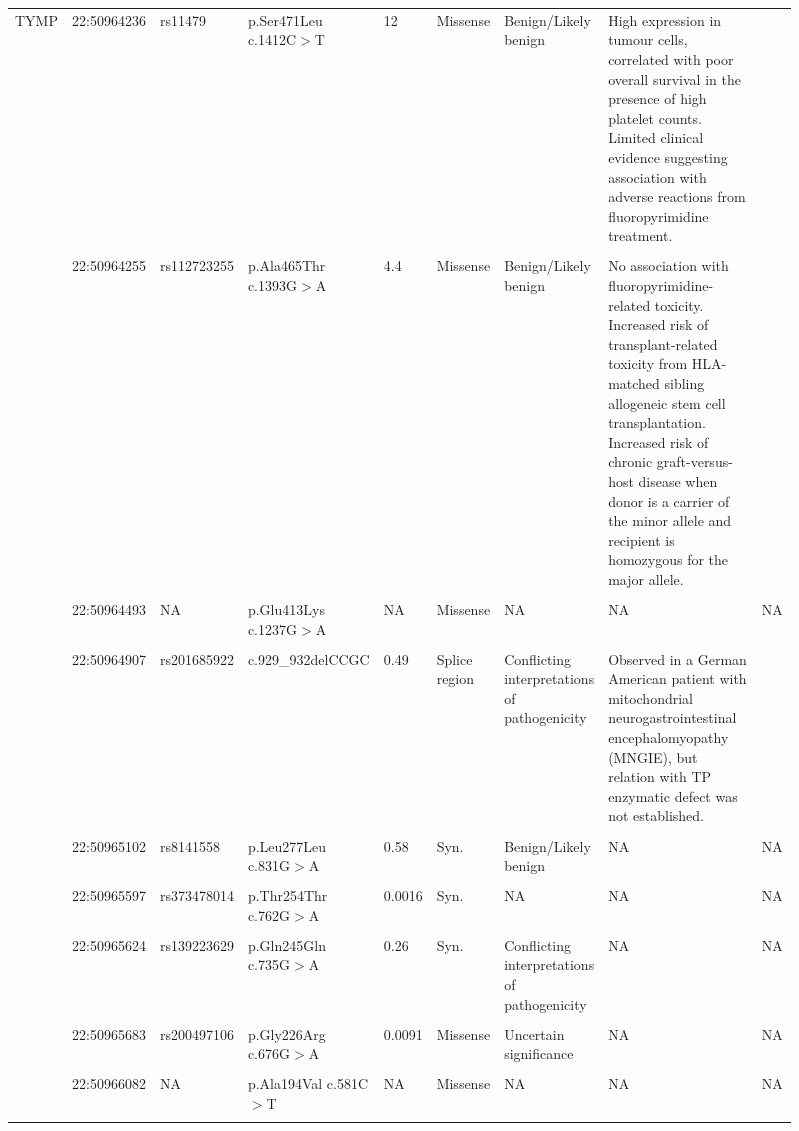 \begin{landscape}
\begin{longtable}{p{0.07\linewidth}|p{0.09\linewidth}p{0.085\linewidth}p{0.14\linewidth}p{0.05\linewidth}p{0.065\linewidth}p{0.11\linewidth}p{0.25\linewidth}p{0.05\linewidth}}
	\\
	\\
	\hline
	TYMP & 22:50964236 & rs11479 & p.Ser471Leu c.1412C$>$T & 12 & Missense & Benign/Likely benign & High expression in tumour cells, correlated with poor overall survival in the presence of high platelet counts. Limited clinical evidence suggesting association with adverse reactions from fluoropyrimidine treatment. & \cite{Caronia2011, Jennings2013, Huang2014}
	\\
	\\
	& 22:50964255 & rs112723255 & p.Ala465Thr c.1393G$>$A & 4.4 & Missense & Benign/Likely benign & No association with fluoropyrimidine-related toxicity. Increased risk of transplant-related toxicity from HLA-matched sibling allogeneic stem cell transplantation. Increased risk of chronic graft-versus-host disease when donor is a carrier of the minor allele and recipient is homozygous for the major allele. & \cite{Guillem2013, Jennings2013, Slager2013}
	\\
	\\
	& 22:50964493 & NA & p.Glu413Lys c.1237G$>$A & NA & Missense & NA & NA & NA
	\\
	\\
	& 22:50964907 & rs201685922 & c.929\_932delCCGC & 0.49 & Splice region & Conflicting \mbox{interpretations} of \mbox{pathogenicity} & Observed in a German American patient with mitochondrial neurogastrointestinal encephalomyopathy (MNGIE), but relation with TP enzymatic defect was not established. & \cite{Nishino2000}
	\\
	\\
	& 22:50965102 & rs8141558 & p.Leu277Leu c.831G$>$A & 0.58 & Syn. & Benign/Likely benign & NA & NA
	\\
	\\
	& 22:50965597 & rs373478014 & p.Thr254Thr c.762G$>$A & 0.0016 & Syn. & NA & NA & NA
	\\
	\\
	& 22:50965624 & rs139223629 & p.Gln245Gln c.735G$>$A & 0.26 & Syn. & Conflicting \mbox{interpretations} of \mbox{pathogenicity} & NA & NA
	\\
	\\
	& 22:50965683 & rs200497106 & p.Gly226Arg c.676G$>$A & 0.0091 & Missense & Uncertain \mbox{significance} & NA & NA
	\\
	\\
	& 22:50966082 & NA & p.Ala194Val c.581C$>$T & NA & Missense & NA & NA & NA
	\\
	\\

\end{longtable}
\end{landscape}
